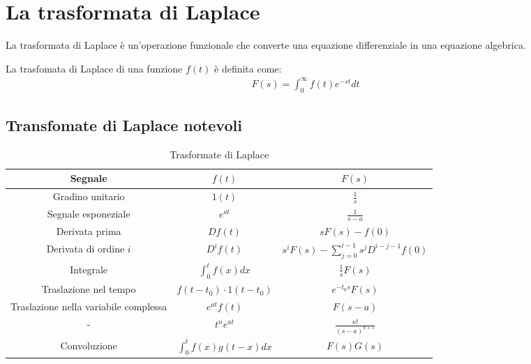 \section{La trasformata di Laplace}

La trasformata di Laplace è un'operazione funzionale che converte una equazione differenziale in una equazione algebrica.

La trasfomata di Laplace di una funzione $f(t)$ è definita come:
\begin{align}
	F(s) = \int_{0}^{\infty} f(t) e^{-st} dt
\end{align}

\subsection{Transfomate di Laplace notevoli}
\renewcommand{\arraystretch}{2.0}
\begin{table}[!ht]
	\begin{adjustbox}{width=0.6\columnwidth,center}
		\begin{tabular}{|c|c|c|}
			\hline
			Segnale                               & $f(t)$                      & $F(s)$                                           \\
			\hline
			Gradino unitario                      & $1(t)$                      & $\frac{1}{s}$                                    \\
			\hline
			Segnale esponeziale                   & $e^{at}$                    & $\frac{1}{s-a}$                                  \\
			\hline
			Derivata prima                        & $Df(t)$                     & $s F(s) - f(0)$                                  \\
			\hline
			Derivata di ordine $i$                & $D^i f(t)$                  & $s^i F(s) - \sum_{j=0}^{i-1} s^j D^{i-j-1} f(0)$ \\
			\hline
			Integrale                             & $\int_0^t f(x) dx$          & $\frac{1}{s} F(s)$                               \\
			\hline
			Traslazione nel tempo                 & $f(t - t_0) \cdot 1(t-t_0)$ & $e^{-t_0 s} F(s)$                                \\
			\hline
			Traslazione nella variabile complessa & $e^{at} f(t)$               & $F(s-a)$                                         \\
			\hline
			-                                     & $t^n e^{at}$                & $\frac{n!}{(s-a)^{n+1}}$                         \\
			\hline
			Convoluzione                          & $\int_0^t f(x)g(t-x)dx$     & $F(s)G(s)$                                       \\
			\hline
		\end{tabular}
	\end{adjustbox}
	\caption{Trasformate di Laplace}
	\label{tab:laplace}
\end{table}

